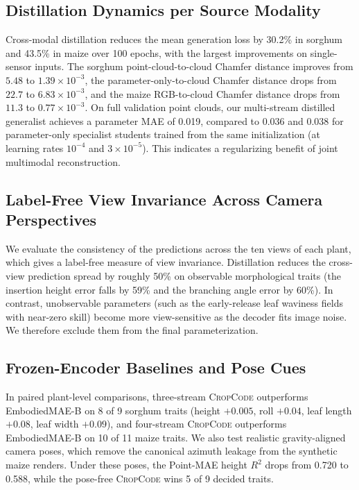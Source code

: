 \documentclass[10pt,twocolumn,letterpaper]{article}
\newcommand{\method}{\textup{\textsc{CropCode}}}   %
\begin{document}
\subsection{Distillation Dynamics per Source Modality}
Cross-modal distillation reduces the mean generation loss by 30.2\% in sorghum and 43.5\% in maize over 100 epochs, with the largest improvements on single-sensor inputs. The sorghum point-cloud-to-cloud Chamfer distance improves from $5.48$ to $1.39 \times 10^{-3}$, the parameter-only-to-cloud Chamfer distance drops from $22.7$ to $6.83 \times 10^{-3}$, and the maize RGB-to-cloud Chamfer distance drops from $11.3$ to $0.77 \times 10^{-3}$. On full validation point clouds, our multi-stream distilled generalist achieves a parameter MAE of 0.019, compared to 0.036 and 0.038 for parameter-only specialist students trained from the same initialization (at learning rates $10^{-4}$ and $3 \times 10^{-5}$). This indicates a regularizing benefit of joint multimodal reconstruction.

\subsection{Label-Free View Invariance Across Camera Perspectives}
We evaluate the consistency of the predictions across the ten views of each plant, which gives a label-free measure of view invariance. Distillation reduces the cross-view prediction spread by roughly 50\% on observable morphological traits (the insertion height error falls by 59\% and the branching angle error by 60\%). In contrast, unobservable parameters (such as the early-release leaf waviness fields with near-zero skill) become more view-sensitive as the decoder fits image noise. We therefore exclude them from the final parameterization.

\subsection{Frozen-Encoder Baselines and Pose Cues}
In paired plant-level comparisons, three-stream \method{} outperforms EmbodiedMAE-B on 8 of 9 sorghum traits (height $+0.005$, roll $+0.04$, leaf length $+0.08$, leaf width $+0.09$), and four-stream \method{} outperforms EmbodiedMAE-B on 10 of 11 maize traits. We also test realistic gravity-aligned camera poses, which remove the canonical azimuth leakage from the synthetic maize renders. Under these poses, the Point-MAE height $R^2$ drops from 0.720 to 0.588, while the pose-free \method{} wins 5 of 9 decided traits.
\end{document}
